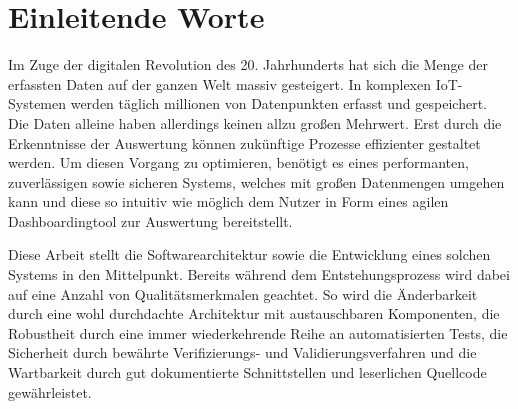 \chapter*{Einleitende Worte}
\label{chap:einleitende-worte}
Im Zuge der digitalen Revolution des 20. Jahrhunderts hat sich die
Menge der erfassten Daten auf der ganzen Welt massiv gesteigert. In
komplexen IoT-Systemen werden täglich millionen von Datenpunkten
erfasst und gespeichert. Die Daten alleine haben allerdings keinen
allzu großen Mehrwert. Erst durch die Erkenntnisse der Auswertung
können zukünftige Prozesse effizienter gestaltet werden. Um diesen
Vorgang zu optimieren, benötigt es eines performanten, zuverlässigen 
sowie sicheren Systems, welches mit großen Datenmengen umgehen kann
und diese so intuitiv wie möglich dem Nutzer in Form eines agilen
Dashboardingtool zur Auswertung bereitstellt.

Diese Arbeit stellt die Softwarearchitektur sowie die Entwicklung
eines solchen Systems in den Mittelpunkt. Bereits während dem
Entstehungsprozess wird dabei auf eine Anzahl von Qualitätsmerkmalen
geachtet. So wird die Änderbarkeit durch eine wohl durchdachte Architektur
mit austauschbaren Komponenten, die Robustheit durch eine immer
wiederkehrende Reihe an automatisierten Tests, die Sicherheit durch bewährte
Verifizierungs- und Validierungsverfahren und die Wartbarkeit durch
gut dokumentierte Schnittstellen und leserlichen Quellcode gewährleistet.

